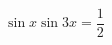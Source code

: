 \begin{ex}[type=equation]
	\begin{condition}
		$\ \sin x\sin 3x =\dfrac{1}{2} $
	\end{condition}
\end{ex}